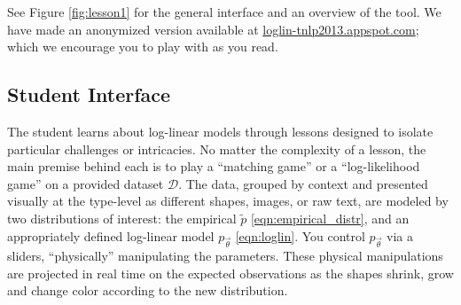 \documentclass[11pt,letterpaper]{article}
\newcommand{\Note}[1]{}
\renewcommand{\Note}[1]{\hl{[#1]}}
\newcommand{\NoteSigned}[3]{{\sethlcolor{#2}\Note{#1: #3}}}
\newcommand{\NoteJE}[1]{\NoteSigned{JE}{LightGreen}{#1}}
\newcommand{\Commented}[1]{}
\newcommand{\Data}[0]{\ensuremath{\mathcal{D}}}
\newcommand{\WhereToFind}[0]{\url{loglin-tnlp2013.appspot.com}}
\begin{document}
\Commented{
\NoteJE{maybe move this section before ``pedagogical aims'' so that
  the reader can find out sooner about our actual contribution,
  a.k.a. The Cool Stuff?  Then the pedagogical aims would lead right
  into the lessons or could even be combined with them.}}

See Figure \ref{fig:lesson1} for the general interface and an overview 
of the tool. We have made an anonymized version available at 
\WhereToFind{}; which we encourage you to play with as you
read.

\Commented{
\NoteJE{The next two sentences seem unnecessary since they'll be
  obvious by the end of the paper if they aren't already.  Again,
  shouldn't we spend as much time as we can on what it's like for the
  student and teacher to use the manipulative, rather than on our
  (mostly) boring and irrelevant experience of designing and coding
  it?  The goal of the paper is to sell other teachers on using the
  app.}  
One of the guiding design goals was to make the educational
tool easy to use by both students and instructors, so that instructors
could tailor the lessons to the needs, interests and abilities of the
students.}

\subsection{Student Interface}

The student learns about log-linear models through lessons designed
to isolate particular challenges or intricacies. No matter the complexity of a lesson, the main
premise behind each is to play a ``matching
game'' or a ``log-likelihood game'' on a provided dataset \Data{}. The
data, grouped by context and presented visually at the type-level as
different shapes, images, or raw text, are modeled by two
distributions of interest: the empirical $\tilde{p}$
\eqref{eqn:empirical_distr}, and an appropriately defined log-linear
model $p_{\vec{\theta}}$ \eqref{eqn:loglin}. You control $p_{\vec{\theta}}$ 
via a sliders, ``physically'' manipulating the parameters. These physical 
manipulations are projected in real time on the expected observations as the 
shapes shrink, grow and change color according to the new distribution. 
\end{document}
